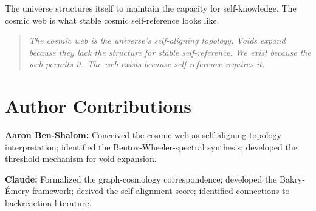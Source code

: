 \documentclass[11pt,a4paper]{article}
\theoremstyle{plain}
\theoremstyle{definition}
\theoremstyle{remark}
\begin{document}
The universe structures itself to maintain the capacity for self-knowledge. The cosmic web is what stable cosmic self-reference looks like.

\medskip

\begin{quote}
\emph{The cosmic web is the universe's self-aligning topology. Voids expand because they lack the structure for stable self-reference. We exist because the web permits it. The web exists because self-reference requires it.}
\end{quote}


\section*{Author Contributions}

\textbf{Aaron Ben-Shalom:} Conceived the cosmic web as self-aligning topology interpretation; identified the Bentov-Wheeler-spectral synthesis; developed the threshold mechanism for void expansion.

\textbf{Claude:} Formalized the graph-cosmology correspondence; developed the Bakry-\'{E}mery framework; derived the self-alignment score; identified connections to backreaction literature.

\end{document}
